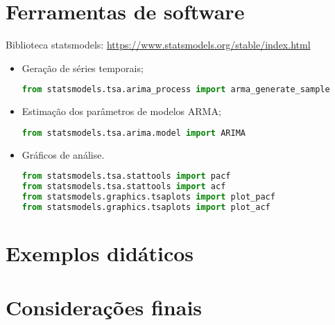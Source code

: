 \documentclass[10pt,hyperref={pdfpagelabels=false}]{beamer}
\begin{document}
\section{Ferramentas de software}%


\begin{frame}[fragile]

Biblioteca \textsf{statsmodels}: \url{https://www.statsmodels.org/stable/index.html}


\begin{itemize}
\item Geração de séries temporais;\\
\begin{lstlisting}[language=Python]
from statsmodels.tsa.arima_process import arma_generate_sample
\end{lstlisting}
%
\item Estimação dos parâmetros de modelos ARMA;\\
\begin{lstlisting}[language=Python]
from statsmodels.tsa.arima.model import ARIMA
\end{lstlisting}

\item Gráficos de análise.\\
\begin{lstlisting}[language=Python]
from statsmodels.tsa.stattools import pacf
from statsmodels.tsa.stattools import acf
from statsmodels.graphics.tsaplots import plot_pacf
from statsmodels.graphics.tsaplots import plot_acf
\end{lstlisting}
\end{itemize}

\end{frame}




\section{Exemplos didáticos}%



\section{Considerações finais}

\frame{
\frametitle{}
\begin{enumerate}
\item 
\item 
\item 
\item 
\end{enumerate}
}
\end{document}
